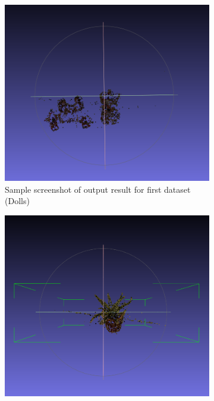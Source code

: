 \documentclass{article}
\begin{document}
\begin{figure}[h]
    \centering
    \begin{subfigure}[b]{0.32\textwidth}
        \centering
        \includegraphics[width=\textwidth]{1.png}
        \caption{Sample screenshot of output result for first dataset (Dolls)}
    \end{subfigure}
    \hfill
    \begin{subfigure}[b]{0.32\textwidth}
        \centering
        \includegraphics[width=\textwidth]{2.png}

\end{subfigure}
\end{figure}
\end{document}
